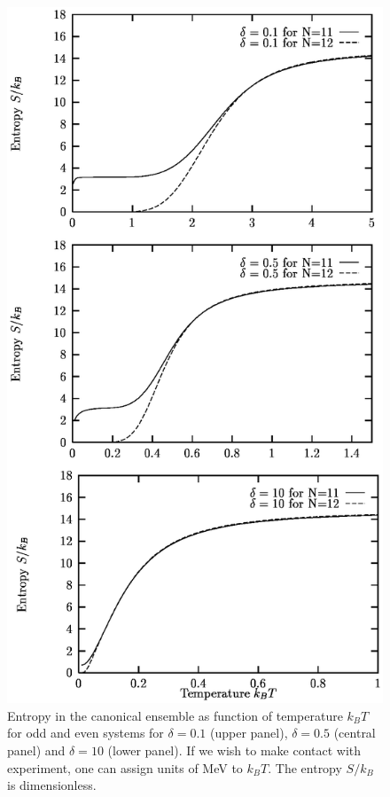 \begin{figure}
\includegraphics[totalheight=20cm,angle=0,bb=0 20 350 730]{fig5.ps}
\caption{Entropy in the canonical ensemble as function of temperature $k_BT$ for odd and even systems for $\delta=0.1$ (upper panel), $\delta=0.5$ (central panel) and $\delta=10$ (lower panel).
If we wish to make contact with experiment, one can assign units of MeV to $k_BT$.
The entropy $S/k_B$ is dimensionless.
} 
\label{fig:fig5}
\end{figure}

